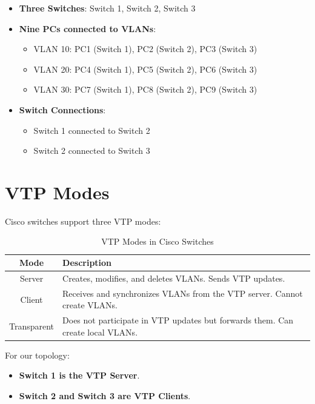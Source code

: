 \documentclass[a4paper]{book}
\begin{document}
\begin{itemize}
    \item \textbf{Three Switches}: Switch 1, Switch 2, Switch 3
    \item \textbf{Nine PCs connected to VLANs}:
    \begin{itemize}
        \item VLAN 10: PC1 (Switch 1), PC2 (Switch 2), PC3 (Switch 3)
        \item VLAN 20: PC4 (Switch 1), PC5 (Switch 2), PC6 (Switch 3)
        \item VLAN 30: PC7 (Switch 1), PC8 (Switch 2), PC9 (Switch 3)
    \end{itemize}
    \item \textbf{Switch Connections}: 
    \begin{itemize}
        \item Switch 1 connected to Switch 2
        \item Switch 2 connected to Switch 3
    \end{itemize}
\end{itemize}

\section{VTP Modes}
Cisco switches support three VTP modes:

\begin{table}[h]
    \centering
    \begin{tabular}{|c|p{10cm}|}
        \hline
        \textbf{Mode} & \textbf{Description} \\
        \hline
        Server & Creates, modifies, and deletes VLANs. Sends VTP updates. \\
        \hline
        Client & Receives and synchronizes VLANs from the VTP server. Cannot create VLANs. \\
        \hline
        Transparent & Does not participate in VTP updates but forwards them. Can create local VLANs. \\
        \hline
    \end{tabular}
    \caption{VTP Modes in Cisco Switches}
\end{table}

For our topology:
\begin{itemize}
    \item \textbf{Switch 1 is the VTP Server}.
    \item \textbf{Switch 2 and Switch 3 are VTP Clients}.
\end{itemize}
\end{document}

